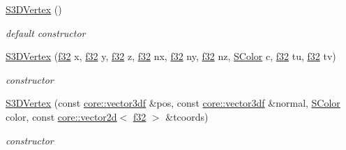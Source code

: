 \begin{DoxyCompactItemize}
\mbox{\label{structirr_1_1video_1_1S3DVertex_a396baea2fe79be060fe7bd50bed81c6e}} 
\hyperlink{structirr_1_1video_1_1S3DVertex_a396baea2fe79be060fe7bd50bed81c6e}{S3\+D\+Vertex} ()
\begin{DoxyCompactList}\small\item\em default constructor \end{DoxyCompactList}\item 
\mbox{\label{structirr_1_1video_1_1S3DVertex_a90158074178ec2c180bafb47c04a763a}} 
\hyperlink{structirr_1_1video_1_1S3DVertex_a90158074178ec2c180bafb47c04a763a}{S3\+D\+Vertex} (\hyperlink{namespaceirr_a0277be98d67dc26ff93b1a6a1d086b07}{f32} x, \hyperlink{namespaceirr_a0277be98d67dc26ff93b1a6a1d086b07}{f32} y, \hyperlink{namespaceirr_a0277be98d67dc26ff93b1a6a1d086b07}{f32} z, \hyperlink{namespaceirr_a0277be98d67dc26ff93b1a6a1d086b07}{f32} nx, \hyperlink{namespaceirr_a0277be98d67dc26ff93b1a6a1d086b07}{f32} ny, \hyperlink{namespaceirr_a0277be98d67dc26ff93b1a6a1d086b07}{f32} nz, \hyperlink{classirr_1_1video_1_1SColor}{S\+Color} c, \hyperlink{namespaceirr_a0277be98d67dc26ff93b1a6a1d086b07}{f32} tu, \hyperlink{namespaceirr_a0277be98d67dc26ff93b1a6a1d086b07}{f32} tv)
\begin{DoxyCompactList}\small\item\em constructor \end{DoxyCompactList}\item 
\mbox{\label{structirr_1_1video_1_1S3DVertex_a4af08bc1db2d4dbac1c6e9f8fe1c01d0}} 
\hyperlink{structirr_1_1video_1_1S3DVertex_a4af08bc1db2d4dbac1c6e9f8fe1c01d0}{S3\+D\+Vertex} (const \hyperlink{namespaceirr_1_1core_ae6e2b2a6c552833ebbd5b7463d03586b}{core\+::vector3df} \&pos, const \hyperlink{namespaceirr_1_1core_ae6e2b2a6c552833ebbd5b7463d03586b}{core\+::vector3df} \&normal, \hyperlink{classirr_1_1video_1_1SColor}{S\+Color} color, const \hyperlink{classirr_1_1core_1_1vector2d}{core\+::vector2d}$<$ \hyperlink{namespaceirr_a0277be98d67dc26ff93b1a6a1d086b07}{f32} $>$ \&tcoords)
\begin{DoxyCompactList}\small\item\em constructor \end{DoxyCompactList}\end{DoxyCompactItemize}
